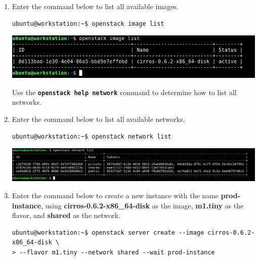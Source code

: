 \documentclass[letterpaper, 12pt]{article}
\begin{document}
\begin{enumerate}
    \item Enter the command below to list all available images.
\begin{lstlisting}
ubuntu@workstation:~$ openstack image list
\end{lstlisting}

    \begin{center}
        \includegraphics[width=\linewidth]{images/part2/step10.png}
    \end{center}

    \begin{tipbox}{}
        Use the \textbf{\texttt{openstack help network}} command to determine how to list all networks.
    \end{tipbox}

    \item Enter the command below to list all available networks.
\begin{lstlisting}
ubuntu@workstation:~$ openstack network list
\end{lstlisting}

    \begin{center}
        \includegraphics[width=\linewidth]{images/part2/step11.png}
    \end{center}

    \item Enter the command below to create a new instance with the name \textbf{prod-instance}, using
    \textbf{cirros-0.6.2-x86\_64-disk} as the image, \textbf{m1.tiny} as the flavor, and \textbf{shared} as the network.
\begin{lstlisting}
ubuntu@workstation:~$ openstack server create --image cirros-0.6.2-x86_64-disk \
> --flavor m1.tiny --network shared --wait prod-instance
\end{lstlisting}


\end{enumerate}
\end{document}
